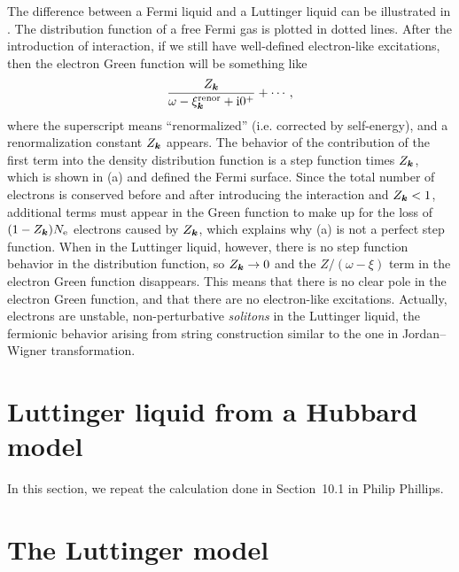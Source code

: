 \documentclass[hyperref, a4paper]{article}
\newcommand*{\ii}{\mathrm{i}}
\begin{document}
The difference between a Fermi liquid and a Luttinger liquid can be illustrated in .
The distribution function of a free Fermi gas is plotted in dotted lines. After the introduction of interaction,
if we still have well-defined electron-like excitations, then the electron Green function will be something like 
\[
    \frac{Z_{\vb*{k}}}{\omega - \xi_{\vb*{k}}^\text{renor} + \ii 0^+} + \cdots,
\]
where the superscript means ``renormalized'' (i.e. corrected by self-energy), and a renormalization constant 
$Z_{\vb*{k}}$ appears. The behavior of the contribution of the first term into the density distribution function 
is a step function times $Z_{\vb*{k}}$, which is shown in (a) and defined the Fermi surface. Since the total 
number of electrons is conserved before and after introducing the interaction and $Z_{\vb*{k}} < 1$, 
additional terms must appear in the Green function to make up for the loss of $(1 - Z_{\vb*{k}}) N_\text{e}$
electrons caused by $Z_{\vb*{k}}$, which explains why (a) is not a perfect 
step function. When in the Luttinger liquid, however, there is no step function behavior in the distribution
function, so $Z_{\vb*{k}} \to 0$ and the $Z/(\omega - \xi)$ term in the electron Green function disappears.
This means that there is no clear pole in the electron Green function, and that there are no electron-like excitations. Actually, electrons are unstable, non-perturbative \emph{solitons} in the Luttinger liquid, 
the fermionic behavior arising from string construction similar to the one in Jordan–Wigner transformation.

\section{Luttinger liquid from a Hubbard model}

In this section, we repeat the calculation done in Section~10.1 in Philip Phillips. 


\section{The Luttinger model}


 
\end{document}
